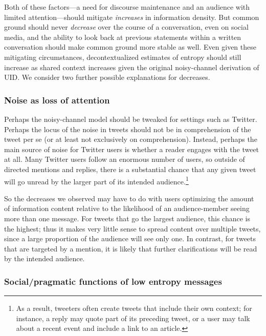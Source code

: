 \documentclass[11pt,letterpaper]{article}
\begin{document}
Both of these factors---a need for discourse maintenance and an audience with limited attention---should mitigate \emph{increases} in information density. But common ground should never \emph{decrease} over the course of a conversation, even on social media, and the ability to look back at previous statements within a written conversation should make common ground more stable as well. Even given these mitigating circumstances, decontextualized estimates of entropy should still increase as shared context increases given the original noisy-channel derivation of UID. We consider two further possible explanations for decreases. 

\subsubsection{Noise as loss of attention}

Perhaps the noisy-channel model should be tweaked for settings such as Twitter. Perhaps the locus of the noise in tweets should not be in comprehension of the tweet per se (or at least not exclusively on comprehension). Instead, perhaps the main source of noise for Twitter users is whether a reader engages with the tweet at all. Many Twitter users follow an enormous number of users, so outside of directed mentions and replies, there is a substantial chance that any given tweet will go unread by the larger part of its intended audience.\footnote{As a result, tweeters often create tweets that include their own context; for instance, a reply may quote part of its preceding tweet, or a user may talk about a recent event and include a link to an article.} 

So the decreases we observed may have to do with users optimizing the amount of information content relative to the likelihood of an audience-member seeing more than one message. For tweets that go the largest audience, this chance is the highest; thus it makes very little sense to spread content over multiple tweets, since a large proportion of the audience will see only one. In contrast, for tweets that are targeted by a mention, it is likely that further clarifications will be read by the intended audience. 

\subsubsection{Social/pragmatic functions of low entropy messages}
\end{document}
